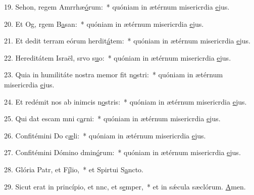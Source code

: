19. Sehon, regem Amrrhæ\uline{ó}rum:~* quóniam in ætérnum misericrdia \uline{e}jus.\par 
20. Et Og, rgem B\uline{a}san:~* quóniam in ætérnum misericrdia \uline{e}jus.\par 
21. Et dedit terram eórum herdit\uline{á}tem:~* quóniam in ætérnum misericrdia \uline{e}jus.\par 
22. Hereditátem Israël, srvo s\uline{u}o:~* quóniam in ætérnum misericrdia \uline{e}jus.\par 
23. Quia in humilitáte nostra memor fit n\uline{o}stri:~* quóniam in ætérnum misericrdia \uline{e}jus.\par 
24. Et redémit nos ab inimcis n\uline{o}stris:~* quóniam in ætérnum misericrdia \uline{e}jus.\par 
25. Qui dat escam mni c\uline{a}rni:~* quóniam in ætérnum misericrdia \uline{e}jus.\par 
26. Confitémini Do c\uline{æ}li:~* quóniam in ætérnum misericrdia \uline{e}jus.\par 
27. Confitémini Dómino dmin\uline{ó}rum:~* quóniam in ætérnum misericrdia \uline{e}jus.\par 
28. Glória Patr, et F\uline{í}lio,~* et Spirtui S\uline{a}ncto.\par 
29. Sicut erat in princípio, et nnc, et s\uline{e}mper,~* et in sǽcula sæclórum. \uline{A}men.\par 
